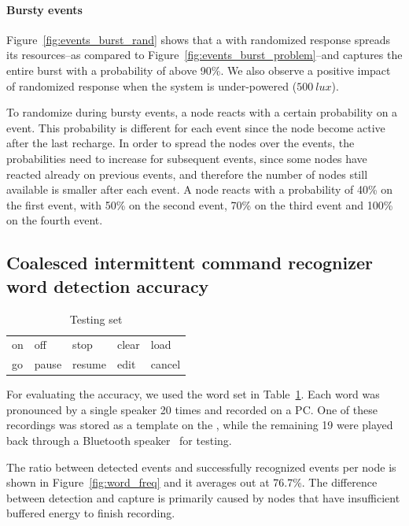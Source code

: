 \paragraph{Bursty events}
Figure~\ref{fig:events_burst_rand} shows that a \sys with randomized response spreads its resources--as compared to Figure~\ref{fig:events_burst_problem}--and captures the entire burst with a probability of above 90\%. We also observe a positive impact of randomized response when the system is under-powered ($\SI{500}{lux}$).

To randomize during bursty events, a node reacts with a certain probability on a event. This probability is different for each event since the node become active after the last recharge. In order to spread the nodes over the events, the probabilities need to increase for subsequent events, since some nodes have reacted already on previous events, and therefore the number of nodes still available is smaller after each event.
A node reacts with a probability of 40\% on the first event, with 50\% on the second event, 70\% on the third event and 100\% on the fourth event.


\subsection{Coalesced intermittent command recognizer word detection accuracy}
\begin{table}[H]
\centering
\caption{Testing set}
\label{tab:words}
\begin{tabular}{lllll}
\hline
on    & off  & stop & clear & load   \\
go & pause & resume & edit  & cancel  \\  
\hline  
\end{tabular}
\end{table}

For evaluating the \fullcim accuracy, we used the word set in Table~\ref{tab:words}.
Each word was pronounced by a single speaker 20 times and recorded on a PC. One of these recordings was stored as a template on the \cim, while the remaining 19 were played back through a Bluetooth speaker~\cite{microphone} for testing.

The ratio between detected events and successfully recognized events per node is shown in Figure~\ref{fig:word_freq} and it averages out at  76.7\%. The difference between detection and capture is primarily caused by nodes that have insufficient buffered energy to finish recording.  

